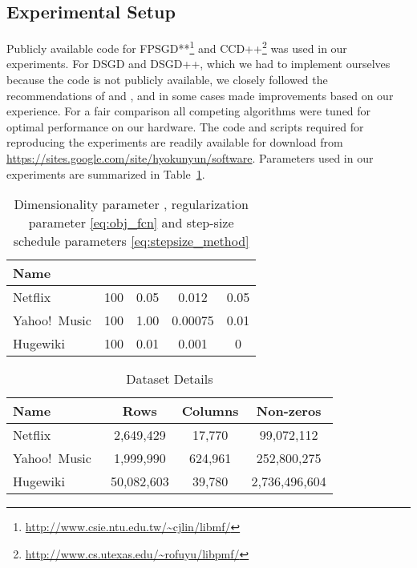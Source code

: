 \documentclass{vldb}
\begin{document}
\subsection{Experimental Setup}
\label{sec:ExperimentalSetup}

Publicly available code for
FPSGD**\footnote{\url{http://www.csie.ntu.edu.tw/~cjlin/libmf/}} and
CCD++\footnote{\url{http://www.cs.utexas.edu/~rofuyu/libpmf/}} was used
in our experiments.  For DSGD and DSGD++, which we had to implement
ourselves because the code is not publicly available, we closely
followed the recommendations of \citet{GemNijHaaSis11} and
\citet{TefMakGem12}, and in some cases made improvements based on our
experience.  For a fair comparison all competing algorithms were tuned
for optimal performance on our hardware.  The code and scripts required
for reproducing the experiments are readily available for download from
\url{https://sites.google.com/site/hyokunyun/software}. Parameters used
in our experiments are summarized in Table~\ref{tab:parameters}.

\begin{table}[htbp]
  \centering
  \caption{Dimensionality parameter , regularization parameter
     \eqref{eq:obj_fcn} and step-size schedule
    parameters  \eqref{eq:stepsize_method}}
  \begin{tabular}[htbp]{|l|c|c|c|c|}
    \hline 
    Name &  &  &  & \\
    \hline
    Netflix & 100 & 0.05 & 0.012 & 0.05 \\
    \hline
    Yahoo!\ Music & 100 & 1.00 & 0.00075 & 0.01 \\
    \hline
    Hugewiki & 100 & 0.01 & 0.001 & 0 \\
    \hline
  \end{tabular}
  \label{tab:parameters}
\end{table}

\begin{table}[htbp]
  \centering
  \caption{Dataset Details}
  \begin{tabular}[htbp]{|l|c|c|c|}
    \hline
    Name & Rows & Columns & Non-zeros \\
    \hline
    Netflix~\citep{BelKor07} & 2,649,429 & 17,770 & 99,072,112  \\
    \hline
    Yahoo!\ Music~\citep{DroKoeKorWei11} & 1,999,990 & 624,961 & 252,800,275  \\
    \hline
    Hugewiki~\citep{GraphLabDatasets} & 50,082,603 & 39,780 & 2,736,496,604 \\
    \hline
  \end{tabular}
  \label{tab:data}
\end{table}
\end{document}
